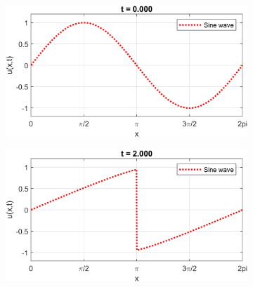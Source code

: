 \documentclass{myproject}
\begin{document}
\begin{figure}
    \centering
    \begin{subfigure}[b]{0.40\textwidth}
       \includegraphics[width=1\linewidth]{sine_wave_0.png}
       \caption{}
    \end{subfigure}\qquad
    \begin{subfigure}[b]{0.40\textwidth}
       \includegraphics[width=1\linewidth]{sine_wave_2.png}
       \caption{}
    \end{subfigure}

    \vspace{\floatsep}


\end{figure}
\end{document}
